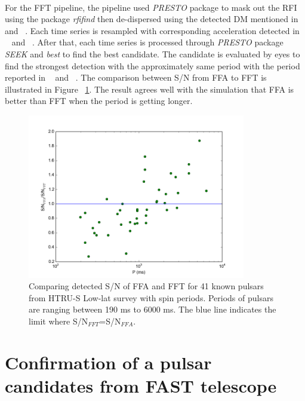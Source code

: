\documentclass[thesis_msc.tex]{subfiles}
\begin{document}
    \paragraph{} For the FFT pipeline, the pipeline used \textit{PRESTO} package to mask out the RFI using the package \textit{rfifind} then de-dispersed using the detected DM mentioned in ~\cite{Andrew} and ~\cite{Ng}. Each time series is resampled with corresponding acceleration detected in ~\cite{Andrew} and ~\cite{Ng}. After that, each time series is processed through \textit{PRESTO} package \textit{SEEK} and \textit{best} to find the best candidate. The candidate is evaluated by eyes to find the strongest detection with the approximately same period with the period reported in ~\cite{Andrew} and ~\cite{Ng}.  The comparison between S/N from FFA to FFT is illustrated in Figure ~\ref{FFA_FFT_real}. The result agrees well with the simulation that FFA is better than FFT when the period is getting longer.  
    
  \begin{figure}[h!]
\centering
\includegraphics[width=0.85\textwidth]{figures/FFA_FFT_real.png}
\caption{Comparing detected S/N of FFA and FFT for 41 known pulsars from HTRU-S Low-lat survey with spin periods. Periods of pulsars are ranging between 190 ms to 6000 ms. The blue line indicates the limit where S/N$_{FFT}$=S/N$_{FFA}.$}\label{FFA_FFT_real}
\end{figure}

    \section{Confirmation of a pulsar candidates from FAST telescope}
\end{document}
